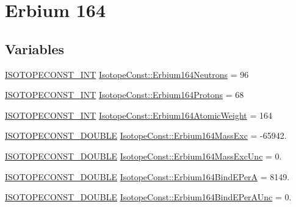 \hypertarget{group___isotope_const-_erbium-_er164}{}\section{Erbium 164}
\label{group___isotope_const-_erbium-_er164}
\subsection*{Variables}
\begin{DoxyCompactItemize}
\item 
\mbox{\hyperlink{group___isotope_const-_macros_ga5f18360b3e99483a35c32d789e62621c}{I\+S\+O\+T\+O\+P\+E\+C\+O\+N\+S\+T\+\_\+\+I\+NT}} \mbox{\hyperlink{group___isotope_const-_erbium-_er164_gad3b479571e9c294f304fb4c79f41c9a7}{Isotope\+Const\+::\+Erbium164\+Neutrons}} = 96
\item 
\mbox{\hyperlink{group___isotope_const-_macros_ga5f18360b3e99483a35c32d789e62621c}{I\+S\+O\+T\+O\+P\+E\+C\+O\+N\+S\+T\+\_\+\+I\+NT}} \mbox{\hyperlink{group___isotope_const-_erbium-_er164_ga0f5eef5c6837bc4a6505333a47aef85d}{Isotope\+Const\+::\+Erbium164\+Protons}} = 68
\item 
\mbox{\hyperlink{group___isotope_const-_macros_ga5f18360b3e99483a35c32d789e62621c}{I\+S\+O\+T\+O\+P\+E\+C\+O\+N\+S\+T\+\_\+\+I\+NT}} \mbox{\hyperlink{group___isotope_const-_erbium-_er164_ga46d00bd5c100f417d45352ad68d05668}{Isotope\+Const\+::\+Erbium164\+Atomic\+Weight}} = 164
\item 
\mbox{\hyperlink{group___isotope_const-_macros_ga8f45a7272ce02c0b4c65c44636ed719a}{I\+S\+O\+T\+O\+P\+E\+C\+O\+N\+S\+T\+\_\+\+D\+O\+U\+B\+LE}} \mbox{\hyperlink{group___isotope_const-_erbium-_er164_ga6ee6b94273f3c528c70297c0423b29a0}{Isotope\+Const\+::\+Erbium164\+Mass\+Exc}} = -\/65942.
\item 
\mbox{\hyperlink{group___isotope_const-_macros_ga8f45a7272ce02c0b4c65c44636ed719a}{I\+S\+O\+T\+O\+P\+E\+C\+O\+N\+S\+T\+\_\+\+D\+O\+U\+B\+LE}} \mbox{\hyperlink{group___isotope_const-_erbium-_er164_ga78310bc65a091357883c80b4ae01da5b}{Isotope\+Const\+::\+Erbium164\+Mass\+Exc\+Unc}} = 0.
\item 
\mbox{\hyperlink{group___isotope_const-_macros_ga8f45a7272ce02c0b4c65c44636ed719a}{I\+S\+O\+T\+O\+P\+E\+C\+O\+N\+S\+T\+\_\+\+D\+O\+U\+B\+LE}} \mbox{\hyperlink{group___isotope_const-_erbium-_er164_ga4d5a79f8b0b19cbb885a678174206bbd}{Isotope\+Const\+::\+Erbium164\+Bind\+E\+PerA}} = 8149.
\item 
\mbox{\hyperlink{group___isotope_const-_macros_ga8f45a7272ce02c0b4c65c44636ed719a}{I\+S\+O\+T\+O\+P\+E\+C\+O\+N\+S\+T\+\_\+\+D\+O\+U\+B\+LE}} \mbox{\hyperlink{group___isotope_const-_erbium-_er164_ga3fec87595f29e10c88cb79cfc42baf9e}{Isotope\+Const\+::\+Erbium164\+Bind\+E\+Per\+A\+Unc}} = 0.

\end{DoxyCompactItemize}

